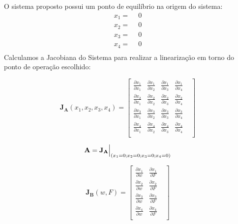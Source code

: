 \documentclass[a4paper]{ifacconf}
\begin{document}
    O sistema proposto possui um ponto de equilíbrio na origem do sistema:
    \begin{equation*}
        \begin{split}
        x_1=\ \ &0\\
        x_2=\ \ &0\\
        x_3=\ \ &0\\
        x_4=\ \ &0\\
        \end{split}
    \end{equation*}
    Calculamos a Jacobiana do Sistema para realizar a linearização em torno do ponto de operação escolhido:
    
    \begin{equation} \label{eq:Jacobian_A}
    \mathbf{J_A}(x_1,x_2,x_3,x_4) =
        \begin{bmatrix}
            \frac{\partial x_1}{\partial x_1} & 
            \frac{\partial x_1}{\partial x_2} & 
            \frac{\partial x_1}{\partial x_3} &
            \frac{\partial x_1}{\partial x_4} &\\[1ex] %
            \frac{\partial x_2}{\partial x_1} & 
            \frac{\partial x_2}{\partial x_2} & 
            \frac{\partial x_2}{\partial x_3} &
            \frac{\partial x_2}{\partial x_4} &\\[1ex]
            \frac{\partial x_3}{\partial x_1} & 
            \frac{\partial x_3}{\partial x_2} & 
            \frac{\partial x_3}{\partial x_3} &
            \frac{\partial x_3}{\partial x_4} &\\[1ex]
            \frac{\partial x_4}{\partial x_1} & 
            \frac{\partial x_4}{\partial x_2} & 
            \frac{\partial x_4}{\partial x_3} &
            \frac{\partial x_4}{\partial x_4} &\\[1ex]
    \end{bmatrix}
    \end{equation}
    
    \begin{equation} \label{eq:eval_A}
        \mathbf{A=J_A} \Bigr\rvert_{(x_1=0;x_2=0;x_3=0;x_4=0)} \\
    \end{equation}
    
    \begin{equation} \label{eq:Jacobian_B}
    \mathbf{J_B}(w,F) =
        \begin{bmatrix}
            \frac{\partial x_1}{\partial w} & 
            \frac{\partial x_1}{\partial F} &\\[1ex] %
            \frac{\partial x_2}{\partial w} & 
            \frac{\partial x_2}{\partial F} &\\[1ex]
            \frac{\partial x_3}{\partial w} & 
            \frac{\partial x_3}{\partial F} &\\[1ex]
            \frac{\partial x_4}{\partial w} & 
            \frac{\partial x_4}{\partial F} &\\[1ex]
    \end{bmatrix}
    \end{equation}
    
\end{document}
